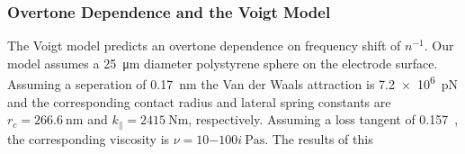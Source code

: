 \documentclass[floatfix,superscriptaddress,a4paper,notitlepage]{revtex4-1}
\begin{document}
\subsubsection{Overtone Dependence and the Voigt Model}

The Voigt model predicts an overtone dependence on frequency shift of
$n^{-1}$.  Our model assumes a \SI{25}{\micro\meter} diameter polystyrene
sphere on the electrode surface.  Assuming a seperation of
\SI{0.17}{\nano\meter} the Van der Waals attraction is
\SI{7.2e6}{\pico\newton} and the corresponding contact radius and lateral
spring constants are $r_c=\SI{266.6}{\nano\meter}$ and $k_\parallel =
  \SI{2415}{\newton\meter}$, respectively.  Assuming a loss tangent of
0.157~\cite{}, the corresponding viscosity is $\nu =
  \SI{10-100i}{\pascal\second}$.  The results of this
\end{document}
